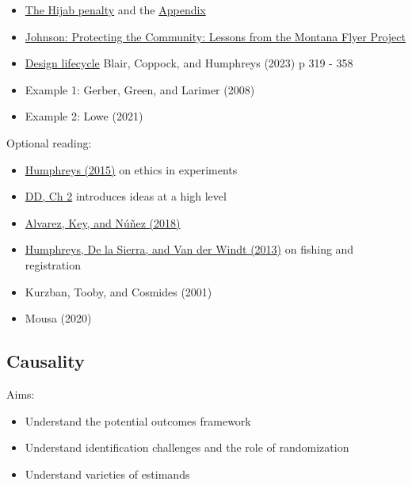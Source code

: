\documentclass[
  10pt,
  a4paper,10pt]{extarticle}
\providecommand{\tightlist}{%
  \setlength{\itemsep}{0pt}\setlength{\parskip}{0pt}}
\begin{document}
\begin{itemize}
\tightlist
\item
  \href{https://onlinelibrary.wiley.com/doi/full/10.1111/ajps.12627}{The
  Hijab penalty} and the
  \href{https://onlinelibrary.wiley.com/action/downloadSupplement?doi=10.1111\%2Fajps.12627&file=ajps12627-sup-0001-Appendix.pdf}{Appendix}
\item
  \href{https://www.cambridge.org/core/journals/ps-political-science-and-politics/article/protecting-the-community-lessons-from-the-montana-flyer-project/2595ED0DB8189897DF6BDB121BBB83CA}{Johnson:
  Protecting the Community: Lessons from the Montana Flyer Project}
\item
  \href{https://book.declaredesign.org/lifecycle}{Design lifecycle}
  Blair, Coppock, and Humphreys (2023) p 319 - 358
\item
  Example 1: Gerber, Green, and Larimer (2008)
\item
  Example 2: Lowe (2021)
\end{itemize}

Optional reading:

\begin{itemize}
\tightlist
\item
  \href{https://macartan.github.io/assets/pdf/papers/2015_reflections_ethics.pdf}{Humphreys
  (2015)} on ethics in experiments
\item
  \href{https://book.declaredesign.org/introduction/what-is-a-research-design.html}{DD,
  Ch 2} introduces ideas at a high level
\item
  \href{https://www.researchgate.net/publication/324240650_Research_Replication_Practical_Considerations/link/5ca3688b458515f7851d7b2e/download?}{Alvarez,
  Key, and Núñez (2018)}
\item
  \href{https://macartan.github.io/assets/pdf/papers/2013_fishing.pdf}{Humphreys,
  De la Sierra, and Van der Windt (2013)} on fishing and registration
\item
  Kurzban, Tooby, and Cosmides (2001)
\item
  Mousa (2020)
\end{itemize}

\subsection{Causality}\label{causality}

Aims:

\begin{itemize}
\tightlist
\item
  Understand the potential outcomes framework
\item
  Understand identification challenges and the role of randomization
\item
  Understand varieties of estimands
\end{itemize}
\end{document}
